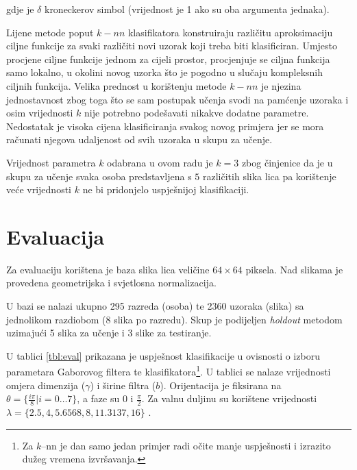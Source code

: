 \documentclass{ru}
\begin{document}
gdje je $\delta$ kroneckerov simbol (vrijednost je 1 ako su oba argumenta jednaka).


Lijene metode poput $k-nn$ klasifikatora konstruiraju različitu aproksimaciju
ciljne funkcije za svaki različiti novi uzorak koji treba biti klasificiran. Umjesto
procjene ciljne funkcije jednom za cijeli prostor, procjenjuje se ciljna funkcija
samo lokalno, u okolini novog uzorka što je pogodno u slučaju kompleksnih ciljnih
funkcija. Velika prednost u korištenju metode $k-nn$ je njezina jednostavnost
zbog toga što se sam postupak učenja svodi na pamćenje uzoraka i osim vrijednosti
$k$ nije potrebno podešavati nikakve dodatne parametre. Nedostatak je visoka
cijena klasificiranja svakog novog primjera jer se mora računati njegova
udaljenost od svih uzoraka u skupu za učenje.

Vrijednost parametra $k$ odabrana u ovom radu je $k = 3$ zbog činjenice da je u
skupu za učenje svaka osoba predstavljena s $5$ različitih slika lica pa
korištenje veće vrijednosti $k$ ne bi pridonjelo uspješnijoj klasifikaciji.

\chapter{Evaluacija}
\label{ch:eval}
Za evaluaciju korištena je baza slika lica veličine $64 \times 64$ piksela. Nad
slikama je provedena geometrijska i svjetlosna normalizacija. 

U bazi se nalazi ukupno 295 razreda (osoba) te 2360 uzoraka (slika) sa
jednolikom razdiobom (8 slika po razredu). Skup je podijeljen \emph{holdout} metodom
uzimajući 5 slika za učenje i 3 slike za testiranje.

U tablici \ref{tbl:eval} prikazana je uspješnost klasifikacije u ovisnosti o izboru
parametara Gaborovog filtera te klasifikatora\footnote{Za $k$--nn je dan samo
jedan primjer radi očite manje uspješnosti i izrazito dužeg vremena
izvršavanja.}. U tablici se nalaze vrijednosti omjera dimenzija ($\gamma$) i širine filtra ($b$).
Orijentacija je fiksirana na $\theta = \{ \frac{i \pi}{8} | i =
0 \ldots 7\}$, a faze su $0$ i $\frac{\pi}{2}$. Za valnu duljinu su korištene
vrijednosti $\lambda = \{2.5, 4, 5.6568, 8, 11.3137, 16\}$
\citep{shen2007gabor}.
\end{document}
